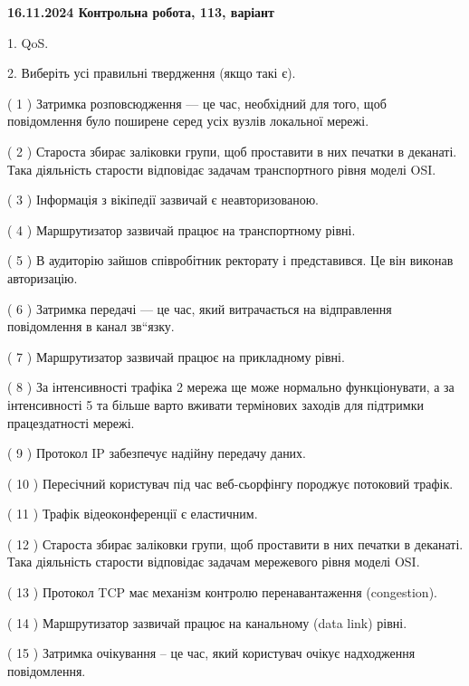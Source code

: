 \documentclass[12pt, ukrainian]{article}
\begin{document}
\begin {large}

\textbf{16.11.2024 Контрольна робота, 113, варіант  }\par


{
1. QoS.



\vspace{5mm}
2. Виберіть усі правильні твердження (якщо такі є).\par
\vspace{2mm}

( 1 ) Затримка розповсюдження — це час, необхідний для того, щоб повідомлення було поширене серед усіх вузлів локальної мережі.

( 2 ) Староста збирає заліковки групи, щоб проставити в них печатки в деканаті. Така діяльність старости відповідає задачам транспортного рівня моделі OSI.

( 3 ) Інформація з вікіпедії зазвичай є неавторизованою.

( 4 ) Маршрутизатор зазвичай працює на транспортному рівні.

( 5 ) В аудиторію зайшов співробітник ректорату і представився. Це він виконав авторизацію.

( 6 ) Затримка передачі — це час, який витрачається на відправлення повідомлення в канал зв“язку.

( 7 ) Маршрутизатор зазвичай працює на прикладному рівні.

( 8 ) За інтенсивності трафіка 2 мережа ще може нормально функціонувати, а за інтенсивності 5 та більше варто вживати термінових заходів для підтримки працездатності мережі.

( 9 ) Протокол IP забезпечує надійну передачу даних.

( 10 ) Пересічний користувач під час веб-сьорфінгу породжує потоковий трафік.

( 11 ) Трафік відеоконференції є еластичним.

( 12 ) Староста збирає заліковки групи, щоб проставити в них печатки в деканаті. Така діяльність старости відповідає задачам мережевого рівня моделі OSI.

( 13 ) Протокол TCP має механізм контролю перенавантаження (congestion).

( 14 ) Маршрутизатор зазвичай працює на канальному (data link) рівні.

( 15 ) Затримка очікування – це час, який користувач очікує надходження повідомлення.
}
\end {large}
\end{document}
